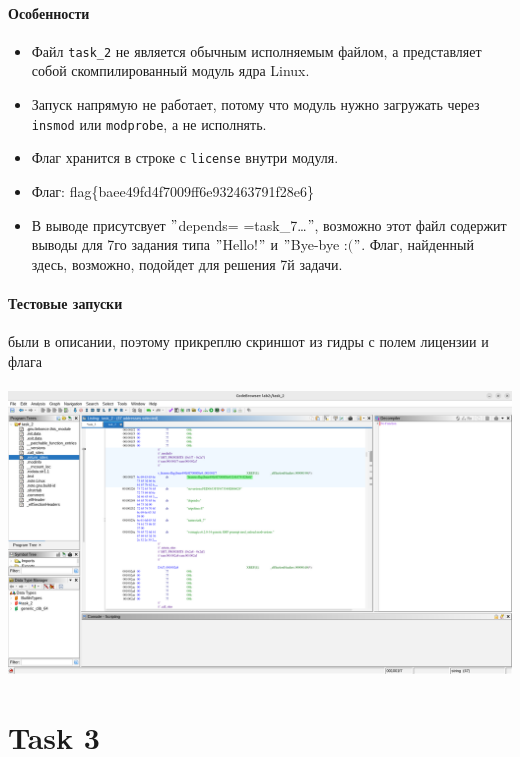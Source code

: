     \noindent

    \paragraph{Особенности}
    \begin{itemize}
        \item Файл \texttt{task\_2} не является обычным исполняемым файлом, а представляет собой скомпилированный модуль ядра Linux.
        \item Запуск напрямую не работает, потому что модуль нужно загружать через \texttt{insmod} или \texttt{modprobe}, а не исполнять.
        \item Флаг хранится в строке с \texttt{license} внутри модуля.
        \item Флаг: flag\{baee49fd4f7009ff6e932463791f28e6\}
        \item В выводе присутсвует \("\)depends= \ldotsname=task\_7\ldots\("\), возможно этот файл содержит выводы для
        7го задания типа \("\)Hello!\("\) и \("\)Bye-bye :$($\("\). Флаг, найденный здесь, возможно, подойдет для решения 7й задачи.
    \end{itemize}

    \paragraph{Тестовые запуски} были в описании, поэтому прикреплю скриншот из гидры с полем лицензии и флага

    \paragraph{}
    \includegraphics[width=1\linewidth]{static/solution_task_2.png}


    \section*{Task 3}

